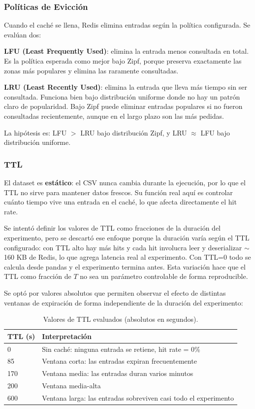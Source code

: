 \documentclass[letter,12pt]{article}
\begin{document}
\subsubsection{Políticas de Evicción}

Cuando el caché se llena, Redis elimina entradas según la política configurada. Se
evalúan dos:

\textbf{LFU (Least Frequently Used)}: elimina la entrada menos consultada en total.
Es la política esperada como mejor bajo Zipf, porque preserva exactamente las zonas
más populares y elimina las raramente consultadas.

\textbf{LRU (Least Recently Used)}: elimina la entrada que lleva más tiempo sin ser
consultada. Funciona bien bajo distribución uniforme donde no hay un patrón claro de
popularidad. Bajo Zipf puede eliminar entradas populares si no fueron consultadas
recientemente, aunque en el largo plazo son las más pedidas.

La hipótesis es: LFU $>$ LRU bajo distribución Zipf, y LRU $\approx$ LFU bajo
distribución uniforme.

\subsubsection{TTL}

El dataset es \textbf{estático}: el CSV nunca cambia durante la ejecución, por lo que
el TTL no sirve para mantener datos frescos. Su función real aquí es controlar cuánto
tiempo vive una entrada en el caché, lo que afecta directamente el hit rate.

Se intentó definir los valores de TTL como fracciones de la duración del experimento,
pero se descartó ese enfoque porque la duración varía según el TTL configurado: con
TTL alto hay más hits y cada hit involucra leer y deserializar $\sim$160 KB de Redis,
lo que agrega latencia real al experimento. Con TTL=0 todo se calcula desde pandas y
el experimento termina antes. Esta variación hace que el TTL como fracción de $T$ no
sea un parámetro controlable de forma reproducible.

Se optó por valores absolutos que permiten observar el efecto de distintas ventanas de
expiración de forma independiente de la duración del experimento:

\begin{table}[H]
\centering
\begin{tabular}{ll}
\toprule
\textbf{TTL (s)} & \textbf{Interpretación} \\
\midrule
0   & Sin caché: ninguna entrada se retiene, hit rate = 0\% \\
85  & Ventana corta: las entradas expiran frecuentemente \\
170 & Ventana media: las entradas duran varios minutos \\
200 & Ventana media-alta \\
600 & Ventana larga: las entradas sobreviven casi todo el experimento \\
\bottomrule
\end{tabular}
\caption{Valores de TTL evaluados (absolutos en segundos).}
\end{table}
\end{document}
